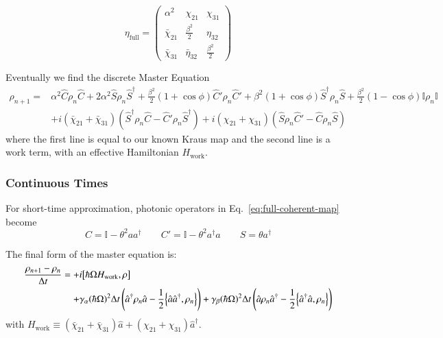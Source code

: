 \documentclass[]{article}
\renewcommand{\a}{\hat{a}}
\newcommand{\ad}{\hat{a}^\dagger}
\newcommand{\ga}{\gamma_\alpha}
\newcommand{\gb}{\gamma_\beta}
\newcommand{\idd}{\mathbb{I}}
\newcommand{\C}{\hat{C}}
\newcommand{\Cp}{\hat{C}'}
\newcommand{\Sd}{\hat{S}^\dagger}
\renewcommand{\S}{\hat{S}}
\renewcommand{\r}{\rho}
\begin{document}
\begin{equation}
    \eta_{\text{full}} = \begin{pmatrix}
        \alpha^2 & \chi_{21} & \chi_{31} \\
        \bar{\chi}_{21} & \frac{\beta^2}{2} & \eta_{32} \\
        \bar{\chi}_{31} & \bar{\eta}_{32} & \frac{\beta^2}{2}  
    \end{pmatrix}
\end{equation}

%
\vspace{5pt}

Eventually we find the discrete Master Equation
\begin{equation}\label{eq:full-coherent-map}
\begin{split}
    \rho_{n+1} =&
    \alpha^2\C\rho_n\C 
    +2\alpha^2\S\rho_n\Sd 
    +\frac{\beta^2}{2}(1+\cos\phi)\Cp\rho_n\Cp
    +\beta^2(1+\cos\phi)\Sd\rho_n\S 
    +\frac{\beta^2}{2}(1 - \cos\phi)\idd\rho_n\idd
    \\
    &+i(\bar{\chi}_{21}+\bar{\chi}_{31})(\Sd\rho_n\C - \Cp\rho_n\Sd)
    +i(\chi_{21}+\chi_{31})(\S\rho_n\Cp - \C\rho_n\S)
\end{split}
\end{equation}
where the first line is equal to our known Kraus map and the second line is a work term, with an effective Hamiltonian $H_{\text{work}}$.


\subsubsection{Continuous Times}
For short-time approximation, photonic operators in Eq.~\ref{eq:full-coherent-map} become
\begin{equation}\label{eq:short-time-approx}
    C=\mathbb{I} - \theta^2aa^\dagger \qquad
    C'= \mathbb{I} - \theta^2a^\dagger a \qquad
    S = \theta a^\dagger 
\end{equation}

%
The final form of the master equation is:
\begin{equation}
\begin{split}
    \frac{\rho_{n+1} - \rho_n}{\Delta t} =
    +&i\comm{\hbar\Omega H_{\text{work}}}{\r} \\
    +&\ga(\hbar\Omega)^2\Delta t\left(\ad\rho_n\a -\frac{1}{2}\acomm{\a\ad}{\rho_n} \right)
    +\gb(\hbar\Omega)^2\Delta t\left(\a\rho_n\ad -\frac{1}{2}\acomm{\ad\a}{\rho_n} \right) 
\end{split}
\end{equation}
with $H_{\text{work}}\equiv(\bar{\chi}_{21}+\bar{\chi}_{31})\a + (\chi_{21}+\chi_{31})\ad$.
\end{document}
